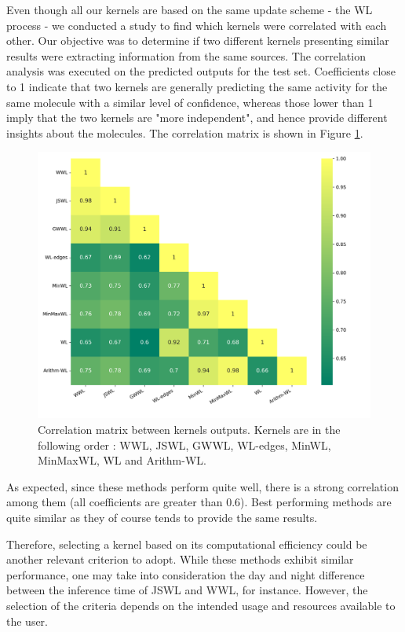 \documentclass{IEEEtran}
\begin{document}
Even though all our kernels are based on the same update scheme - the WL process -
we conducted a study to find which kernels were correlated with each other.
Our objective was to determine if two different kernels presenting similar results
were extracting information from the same sources.
The correlation analysis was executed on the predicted outputs for the test set.
Coefficients close to 1 indicate that two kernels are generally predicting
the same activity for the same molecule with a similar level of confidence,
whereas those lower than 1 imply that the two kernels are "more independent",
and hence provide different insights about the molecules.
The correlation matrix is shown in Figure \ref{fig:correlation}.

\begin{figure}[h]
    \centering
    \includegraphics[width=\linewidth]{corr_matrix.png}
    \caption{Correlation matrix between kernels outputs.
        Kernels are in the following order :
        WWL, JSWL, GWWL, WL-edges, MinWL, MinMaxWL, WL and Arithm-WL.
    }
    \label{fig:correlation}
\end{figure}

As expected, since these methods perform quite well,
there is a strong correlation among them
(all coefficients are greater than $0.6$).
Best performing methods are quite similar
as they of course tends to provide the same results.

Therefore, selecting a kernel based on its computational efficiency could be another relevant
criterion to adopt. While these methods exhibit similar performance,
one may take into consideration the day and night difference between the inference time of JSWL and WWL,
for instance.
However, the selection of the criteria depends on the intended usage and resources available to the user.
\end{document}
